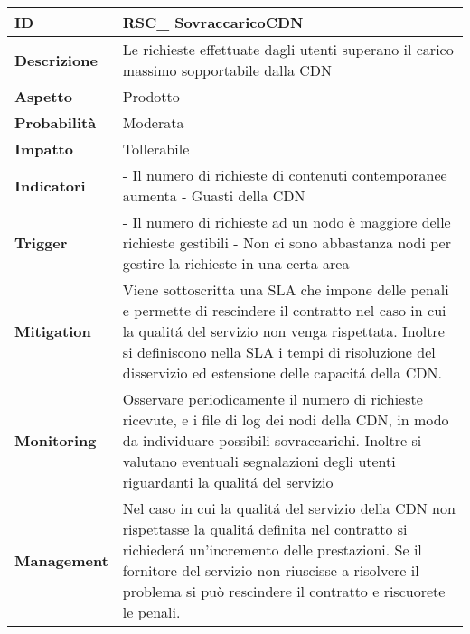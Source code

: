 \begin{tabular}{|p{2.2cm}|p{9.6cm}| } 
 	\hline
	 \textbf{ID} & RSC\_ SovraccaricoCDN\\ [0.5ex] 
	\hline
	\textbf{Descrizione} & Le richieste effettuate dagli utenti superano il carico massimo sopportabile dalla CDN \\ 
	\hline
   	\textbf{Aspetto} &  Prodotto \\
	\hline
	\textbf{Probabilità} &  Moderata \\ 
	\hline
	\textbf{Impatto} &  Tollerabile \\ 
	\hline
	\textbf{Indicatori} & - Il numero di richieste di contenuti contemporanee aumenta \newline
						  - Guasti della CDN\\
	\hline
	\textbf{Trigger} & - Il numero di richieste ad un nodo è maggiore delle richieste gestibili\newline
					   - Non ci sono abbastanza nodi per gestire la richieste in una certa area\\
	\hline
	\textbf{Mitigation} & Viene sottoscritta una SLA che impone delle penali e permette di rescindere il contratto nel caso in cui la qualit\'a del servizio non venga rispettata. Inoltre si definiscono nella SLA i tempi di risoluzione del disservizio ed estensione delle capacit\'a della CDN. \\ 
	\hline
	\textbf{Monitoring} & Osservare periodicamente il numero di richieste ricevute, e i file di log dei nodi della CDN, in modo da individuare possibili sovraccarichi. Inoltre si valutano eventuali segnalazioni degli utenti riguardanti la qualit\'a del servizio\\ 
	\hline
	\textbf{Management} & Nel caso in cui la qualit\'a del servizio della CDN non rispettasse la qualit\'a definita nel contratto si richieder\'a un'incremento delle prestazioni. Se il fornitore del servizio non riuscisse a risolvere il problema si può rescindere il contratto e riscuorete le penali. \\ 
	\hline
\end{tabular}


